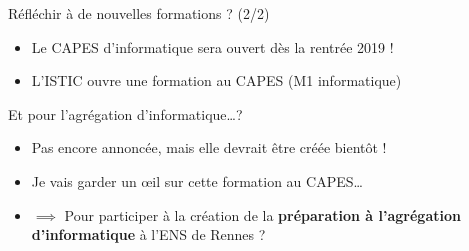 \documentclass[11pt,english,ignorenonframetext,]{beamer}
\providecommand{\tightlist}{%
  \setlength{\itemsep}{0pt}\setlength{\parskip}{0pt}}
\begin{document}
\begin{frame}{Réfléchir à de nouvelles formations ? \hfill{} (2/2)}

\begin{itemize}
\item
  Le \textcolor{info}{CAPES d'informatique} sera ouvert dès la rentrée 2019 !
\item
  L'ISTIC ouvre une formation au CAPES (\textcolor{info}{M1 informatique})
\end{itemize}

\vspace*{30pt}

\begin{alertblock}{Et pour l'agrégation d'informatique\ldots{}?}
  \begin{itemize}
    \item
    Pas encore annoncée, mais elle devrait être créée bientôt !
    \pause
    \item
    Je vais garder un œil sur cette formation au CAPES\ldots{}
    \item
    $\implies$ Pour participer à la création de la \textcolor{info}{\textbf{préparation à l'agrégation d'informatique}} à l'ENS de Rennes ?
  \end{itemize}
  \end{alertblock}






\end{frame}
\end{document}
